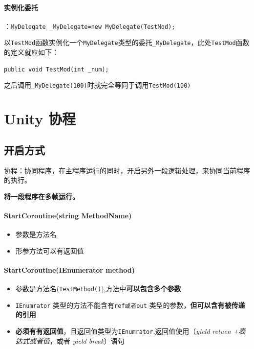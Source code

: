 \documentclass[UTF8,a4paper,12pt]{ctexbook}
\begin{document}
		\paragraph{实例化委托}：\verb|MyDelegate _MyDelegate=new MyDelegate(TestMod);|
			
			以\verb|TestMod|函数实例化一个\verb|MyDelegate|类型的委托\verb|_MyDelegate|，此处\verb|TestMod|函数的定义就应如下：
				
			\verb|public void TestMod(int _num);|
				
			之后调用\verb|_MyDelegate(100)|时就完全等同于调用\verb|TestMod(100)|
		
		
		
	\section{Unity 协程}
		\subsection{开启方式}
			协程：协同程序，在主程序运行的同时，开启另外一段逻辑处理，来协同当前程序的执行。
			
			\textbf{将一段程序在多帧运行。}
			
			\paragraph{StartCoroutine(string MethodName)}
				\begin{itemize}
					\item 参数是方法名					
					\item 形参方法可以有返回值
				\end{itemize}
			
			\paragraph{StartCoroutine(IEnumerator method)}
				\begin{itemize}
					\item 参数是方法名(\verb|TestMethod()|),方法中\textbf{可以包含多个参数}
					\item \verb|IEnumrator| 类型的方法不能含有\verb|ref或者out| 类型的参数，\textbf{但可以含有被传递的引用}
					\item \textbf{必须有有返回值}，且返回值类型为\verb|IEnumrator|,返回值使用（\textit{yield retuen +表达式或者值}，或者 \textit{yield break}）语句	
			\end{itemize}
		
\end{document}
